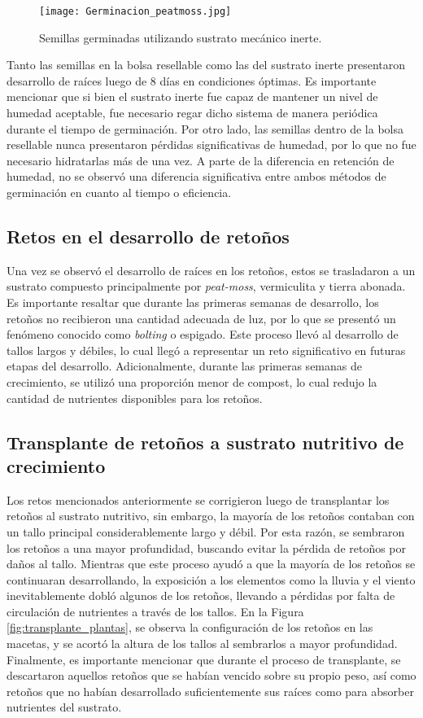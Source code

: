 \begin{figure}[H]
	\centering
	\texttt{[image: Germinacion\_peatmoss.jpg]}
	\caption{Semillas germinadas utilizando sustrato mecánico inerte.}
	\label{fig:peatmoss}
\end{figure}

Tanto las semillas en la bolsa resellable como las del sustrato inerte presentaron desarrollo de raíces luego de 8 días en condiciones óptimas. Es importante mencionar que si bien el sustrato inerte fue capaz de mantener un nivel de humedad aceptable, fue necesario regar dicho sistema de manera periódica durante el tiempo de germinación. Por otro lado, las semillas dentro de la bolsa resellable nunca presentaron pérdidas significativas de humedad, por lo que no fue necesario hidratarlas más de una vez. A parte de la diferencia en retención de humedad, no se observó una diferencia significativa entre ambos métodos de germinación en cuanto al tiempo o eficiencia. 

\subsection{Retos en el desarrollo de retoños}

Una vez se observó el desarrollo de raíces en los retoños, estos se trasladaron a un sustrato compuesto principalmente por \textit{peat-moss}, vermiculita y tierra abonada. Es importante resaltar que durante las primeras semanas de desarrollo, los retoños no recibieron una cantidad adecuada de luz, por lo que se presentó un fenómeno conocido como \textit{bolting} o espigado. Este proceso llevó al desarrollo de tallos largos y débiles, lo cual llegó a representar un reto significativo en futuras etapas del desarrollo. Adicionalmente, durante las primeras semanas de crecimiento, se utilizó una proporción menor de compost, lo cual redujo la cantidad de nutrientes disponibles para los retoños.

\subsection{Transplante de retoños a sustrato nutritivo de crecimiento}

Los retos mencionados anteriormente se corrigieron luego de transplantar los retoños al sustrato nutritivo, sin embargo, la mayoría de los retoños contaban con un tallo principal considerablemente largo y débil. Por esta razón, se sembraron los retoños a una mayor profundidad, buscando evitar la pérdida de retoños por daños al tallo. Mientras que este proceso ayudó a que la mayoría de los retoños se continuaran desarrollando, la exposición a los elementos como la lluvia y el viento inevitablemente dobló algunos de los retoños, llevando a pérdidas por falta de circulación de nutrientes a través de los tallos. En la Figura \ref{fig:transplante_plantas}, se observa la configuración de los retoños en las macetas, y se acortó la altura de los tallos al sembrarlos a mayor profundidad. Finalmente, es importante mencionar que durante el proceso de transplante, se descartaron aquellos retoños que se habían vencido sobre su propio peso, así como retoños que no habían desarrollado suficientemente sus raíces como para absorber nutrientes del sustrato.

